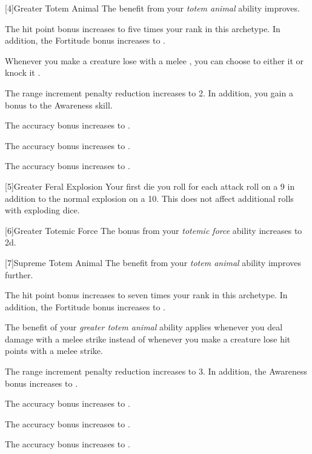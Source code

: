         [4]{Greater Totem Animal} The benefit from your \textit{totem animal} ability improves.
        {
             The hit point bonus increases to five times your rank in this archetype.
            In addition, the Fortitude bonus increases to .

             Whenever you make a creature lose  with a melee , you can choose to either  it or knock it .

             The range increment penalty reduction increases to 2.
            In addition, you gain a  bonus to the Awareness skill.

             The accuracy bonus increases to .

             The accuracy bonus increases to .

             The accuracy bonus increases to .
        }

        [5]{Greater Feral Explosion} Your first die you roll for each attack roll  on a 9 in addition to the normal explosion on a 10.
        This does not affect additional rolls with exploding dice.

        [6]{Greater Totemic Force} The bonus from your \textit{totemic force} ability increases to \plus2d.

        [7]{Supreme Totem Animal} The benefit from your \textit{totem animal} ability improves further.
        {
             The hit point bonus increases to seven times your rank in this archetype.
            In addition, the Fortitude bonus increases to .

             The benefit of your \textit{greater totem animal} ability applies whenever you deal damage with a melee strike instead of whenever you make a creature lose hit points with a melee strike.

             The range increment penalty reduction increases to 3.
            In addition, the Awareness bonus increases to .

             The accuracy bonus increases to .

             The accuracy bonus increases to .

             The accuracy bonus increases to .
        }


